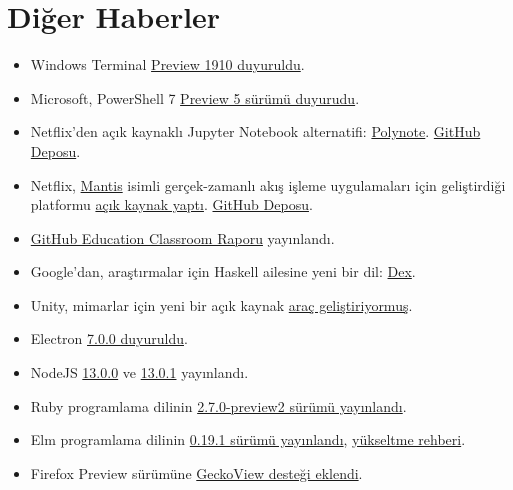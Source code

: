 \documentclass[11pt]{article}
\begin{document}
\section{Diğer Haberler}
\label{sec:org4c6b90e}
\begin{itemize}
\item Windows Terminal \href{https://devblogs.microsoft.com/commandline/windows-terminal-preview-1910-release/}{Preview 1910 duyuruldu}.
\item Microsoft, PowerShell 7 \href{https://devblogs.microsoft.com/powershell/powershell-7-preview-5/}{Preview 5 sürümü duyurudu}.
\item Netflix'den açık kaynaklı Jupyter Notebook alternatifi: \href{https://medium.com/netflix-techblog/open-sourcing-polynote-an-ide-inspired-polyglot-notebook-7f929d3f447}{Polynote}. \href{https://github.com/polynote/polynote}{GitHub
Deposu}.
\item Netflix, \href{https://netflix.github.io/mantis/}{Mantis} isimli gerçek-zamanlı akış işleme uygulamaları
için geliştirdiği platformu \href{https://medium.com/netflix-techblog/open-sourcing-mantis-a-platform-for-building-cost-effective-realtime-operations-focused-5b8ff387813a}{açık kaynak yaptı}. \href{https://github.com/netflix/mantis/}{GitHub Deposu}.
\item \href{https://education.github.com/classroom-report/2019}{GitHub Education Classroom Raporu} yayınlandı.
\item Google'dan, araştırmalar için Haskell ailesine yeni bir dil: \href{https://github.com/google-research/dex-lang}{Dex}.
\item Unity, mimarlar için yeni bir açık kaynak \href{https://archpaper.com/2019/10/unity-reflect-open-source-tool/}{araç geliştiriyormuş}.
\item Electron \href{https://electronjs.org/blog/electron-7-0}{7.0.0 duyuruldu}.
\item NodeJS \href{https://github.com/nodejs/node/releases/tag/v13.0.0}{13.0.0} ve \href{https://github.com/nodejs/node/releases/tag/v13.0.1}{13.0.1} yayınlandı.
\item Ruby programlama dilinin \href{https://www.ruby-lang.org/en/news/2019/10/22/ruby-2-7-0-preview2-released/}{2.7.0-preview2 sürümü yayınlandı}.
\item Elm programlama dilinin \href{https://elm-lang.org/news/the-syntax-cliff}{0.19.1 sürümü yayınlandı}, \href{https://github.com/elm/compiler/blob/master/docs/upgrade-instructions/0.19.1.md}{yükseltme rehberi}.
\item Firefox Preview sürümüne \href{https://blog.mozilla.org/addons/2019/10/23/fx-preview-geckoview-add-ons-support/}{GeckoView desteği eklendi}.

\end{itemize}
\end{document}
